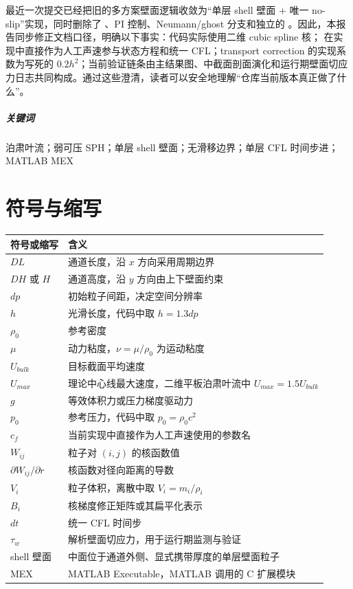 最近一次提交已经把旧的多方案壁面逻辑收敛为“单层 shell 壁面 + 唯一 no-slip”实现，同时删除了 、PI 控制、Neumann/ghost 分支和独立的 。因此，本报告同步修正文档口径，明确以下事实：代码实际使用二维 cubic spline 核； 在实现中直接作为人工声速参与状态方程和统一 CFL；transport correction 的实现系数为写死的 $0.2h^2$；当前验证链条由主结果图、中截面剖面演化和运行期壁面切应力日志共同构成。通过这些澄清，读者可以安全地理解“仓库当前版本真正做了什么”。

\paragraph{关键词}
泊肃叶流；弱可压 SPH；单层 shell 壁面；无滑移边界；单层 CFL 时间步进；MATLAB MEX

\chapter*{符号与缩写}
\begin{longtable}{p{} p{}}
\toprule
符号或缩写 & 含义 \\
\midrule
\endhead
$DL$ & 通道长度，沿 $x$ 方向采用周期边界 \\
$DH$ 或 $H$ & 通道高度，沿 $y$ 方向由上下壁面约束 \\
$dp$ & 初始粒子间距，决定空间分辨率 \\
$h$ & 光滑长度，代码中取 $h=1.3dp$ \\
$\rho_0$ & 参考密度 \\
$\mu$ & 动力粘度，$\nu=\mu/\rho_0$ 为运动粘度 \\
$U_{bulk}$ & 目标截面平均速度 \\
$U_{max}$ & 理论中心线最大速度，二维平板泊肃叶流中 $U_{max}=1.5U_{bulk}$ \\
$g$ & 等效体积力或压力梯度驱动力 \\
$p_0$ & 参考压力，代码中取 $p_0=\rho_0 c^2$ \\
$c_f$ & 当前实现中直接作为人工声速使用的参数名 \\
$W_{ij}$ & 粒子对 $(i,j)$ 的核函数值 \\
$\partial W_{ij}/\partial r$ & 核函数对径向距离的导数 \\
$V_i$ & 粒子体积，离散中取 $V_i=m_i/\rho_i$ \\
$B_i$ & 核梯度修正矩阵或其扁平化表示 \\
$dt$ & 统一 CFL 时间步 \\
$\tau_w$ & 解析壁面切应力，用于运行期监测与验证 \\
shell 壁面 & 中面位于通道外侧、显式携带厚度的单层壁面粒子 \\
MEX & MATLAB Executable，MATLAB 调用的 C 扩展模块 \\
\bottomrule
\end{longtable}

\tableofcontents
\clearpage
